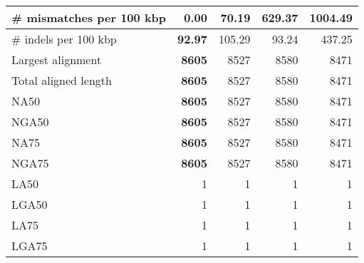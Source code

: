\documentclass[12pt,a4paper]{article}
\begin{document}
\begin{table}[ht]
\begin{center}
\begin{tabular}{|l*{4}{|r}|}
\# mismatches per 100 kbp & {\bf 0.00} & 70.19 & 629.37 & 1004.49 \\ \hline
\# indels per 100 kbp & {\bf 92.97} & 105.29 & 93.24 & 437.25 \\ \hline
Largest alignment & {\bf 8605} & 8527 & 8580 & 8471 \\ \hline
Total aligned length & {\bf 8605} & 8527 & 8580 & 8471 \\ \hline
NA50 & {\bf 8605} & 8527 & 8580 & 8471 \\ \hline
NGA50 & {\bf 8605} & 8527 & 8580 & 8471 \\ \hline
NA75 & {\bf 8605} & 8527 & 8580 & 8471 \\ \hline
NGA75 & {\bf 8605} & 8527 & 8580 & 8471 \\ \hline
LA50 & 1 & 1 & 1 & 1 \\ \hline
LGA50 & 1 & 1 & 1 & 1 \\ \hline
LA75 & 1 & 1 & 1 & 1 \\ \hline
LGA75 & 1 & 1 & 1 & 1 \\ \hline
\end{tabular}
\end{center}
\end{table}
\end{document}
